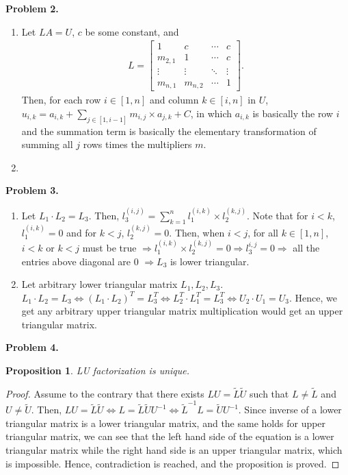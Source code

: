 \documentclass{article}
\newtheorem{prop}[thm]{Proposition}
\begin{document}
\bigbreak

\textbf{Problem 2.}
\begin{enumerate}[label={\alph*)}]
    \item 
    Let $LA = U$, $c$ be some constant, and 
    \begin{align}
        L = 
        \begin{bmatrix}
            1 & c & \cdots & c \\
            m_{2,1} & 1 & \cdots & c \\
            \vdots & \vdots & \ddots & \vdots \\
            m_{n,1} & m_{n,2} & \cdots & 1
        \end{bmatrix}. \nonumber
    \end{align}
    Then, for each row $i \in [1,n]$ and column $k\in [i,n]$ in $U$, $u_{i, k} = a_{i, k} + \sum\limits_{j\in[1,i-1]}m_{i, j}\times a_{j,k} + C$, in which $a_{i,k}$ is basically the row $i$ and the summation term is basically the elementary transformation of summing all $j$ rows times the multipliers $m$.

    \item

\end{enumerate}
\bigbreak

\textbf{Problem 3.}
\begin{enumerate}[label={\alph*)}]
    \item 
    Let $L_1 \cdot L_2 = L_3$.
    Then, $l_3^{(i, j)} = \sum\limits_{k=1}^{n}l_1^{(i,k)}\times l_2^{(k,j)}$. Note that for $i < k$, $l_1^{(i,k)} = 0$ and for $k < j$, $l_2^{(k,j)} = 0$.
    Then, when $i < j$, for all $k\in [1,n]$, $i<k$ or $k<j$ must be true $\Rightarrow l_1^{(i,k)}\times l_2^{(k,j)}=0 \Rightarrow l_3^{i,j} = 0 \Rightarrow$  all the entries above diagonal are 0 $\Rightarrow L_3$ is lower triangular.

    \item 
    Let arbitrary lower triangular matrix $L_1, L_2, L_3$. $L_1 \cdot L_2 = L_3 \Leftrightarrow (L_1\cdot L_2)^T = L_3^T \Leftrightarrow L_2^T \cdot L_1^T = L_3^T \Leftrightarrow U_2 \cdot U_1 = U_3$.
    Hence, we get any arbitrary upper triangular matrix multiplication would get an upper triangular matrix.
\end{enumerate}
\bigbreak

\textbf{Problem 4.}
\begin{prop}
    LU factorization is unique.
\end{prop}
\begin{proof}
    Assume to the contrary that there exists $LU = \tilde{L}\tilde{U}$ such that $L \neq \tilde{L}$ and $U \neq \tilde{U}$.
    Then, $LU = \tilde{L}\tilde{U} \Leftrightarrow L = \tilde{L}\tilde{U}U^{-1} \Leftrightarrow \tilde{L}^{-1}L = \tilde{U}U^{-1}$.
    Since inverse of a lower triangular matrix is a lower triangular matrix, and the same holds for upper triangular matrix, we can see that the left hand side of the equation is a lower triangular matrix while the right hand side is an upper triangular matrix, which is impossible.
    Hence, contradiction is reached, and the proposition is proved.
\end{proof}
\bigbreak
\end{document}
